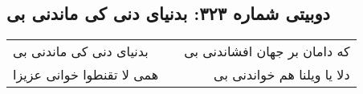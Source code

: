 \begin{center}
\section*{دوبیتی شماره ۳۲۳: بدنیای دنی کی ماندنی بی}
\label{sec:323}
\begin{longtable}{l p{0.5cm} r}
بدنیای دنی کی ماندنی بی
&&
که دامان بر جهان افشاندنی بی
\\
همی لا تقنطوا خوانی عزیزا
&&
دلا یا ویلنا هم خواندنی بی
\\
\end{longtable}
\end{center}
